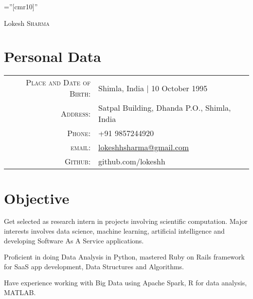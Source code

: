 \documentclass[a4paper,10pt]{article}
\begin{document}

\pagestyle{empty} %

\font\fb=''[cmr10]'' %

\par{\centering
		{\Huge Lokesh \textsc{Sharma}
	}\bigskip\par}

\section{Personal Data}

\begin{tabular}{rl}
    \textsc{Place and Date of Birth:} & Shimla, India  | 10 October 1995 \\
    \textsc{Address:}   & Satpal Building, Dhanda P.O., Shimla, India \\
    \textsc{Phone:}     & +91 9857244920\\
    \textsc{email:}     & \href{mailto:lokeshhsharma@gmail.com}{lokeshhsharma@gmail.com} \\
    \textsc{Github:}    & github.com/lokeshh\\
\end{tabular}

\section{Objective}
Get selected as research intern in projects involving scientific computation. Major interests involves data science, machine learning, artificial intelligence and developing Software As A Service applications.

Proficient in doing Data Analysis in Python, mastered Ruby on Rails framework for SaaS app development, Data Structures and Algorithms.

Have experience working with Big Data using Apache Spark, R for data analysis, MATLAB.
\end{document}
